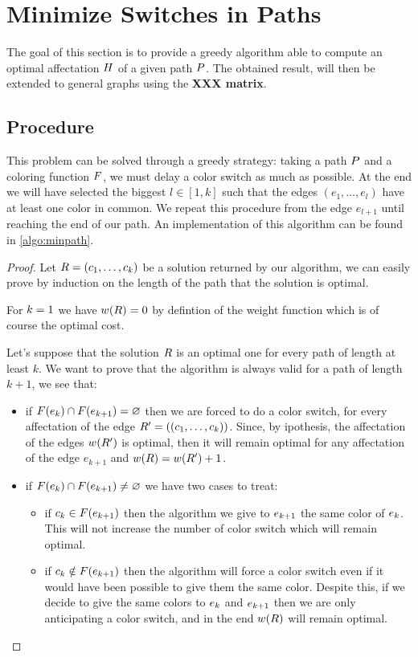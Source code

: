 \section{Minimize Switches in Paths}

The goal of this section is to provide a greedy algorithm able to compute an optimal affectation $H$ of a given path $P$. The obtained result, will then be extended to general graphs using the \textbf{XXX matrix}.

\subsection{Procedure}
\label{sec:path_proc}
This problem can be solved through a greedy strategy: taking a path $P$ and a coloring function $F$, we must delay a color switch as much as possible. At the end we will have selected the biggest $l \in [1, k]$ such that the edges $(e_1, \dots, e_l)$ have at least one color in common. We repeat this procedure from the edge $e_{l+1}$ until reaching the end of our path. An implementation of this algorithm can be found in \cref{algo:minpath}.

\begin{proof}
  Let $R = (c_1,\ldots,c_{k})$ be a solution returned by our algorithm, we can easily prove by induction on the length of the path that the solution is optimal.

  For $k = 1$ we have $w(R) = 0$ by defintion of the weight function which is of course the optimal cost.

  Let's suppose that the solution $R$ is an optimal one for every path of length at least $k$. We want to prove that the algorithm is always valid for a path of length $k+1$, we see that:

  \begin{itemize}
    \item if $F(e_k) \cap F(e_{k+1}) = \varnothing$ then we are forced to do a color switch, for every affectation of the edge $R' = ((c_1,\ldots,c_{k}))$. Since, by ipothesis, the affectation of the edges $w(R')$ is optimal, then it will remain optimal for any affectation of the edge $e_{k+1}$ and $w(R) = w(R') + 1$.
    \item if $F(e_k) \cap F(e_{k+1}) \neq \varnothing$ we have two cases to treat:
          \begin{itemize}
            \item if $c_k \in F(e_{k+1})$ then the algorithm we give to $e_{k+1}$ the same color of $e_{k}$. This will not increase the number of color switch which will remain optimal.
            \item if $c_k \notin F(e_{k+1})$ then the algorithm will force a color switch even if it would have been possible to give them the same color. Despite this, if we decide to give the same colors to $e_k$ and $e_{k+1}$ then we are only anticipating a color switch, and in the end $w(R)$ will remain optimal.
          \end{itemize}
  \end{itemize}
\end{proof}

